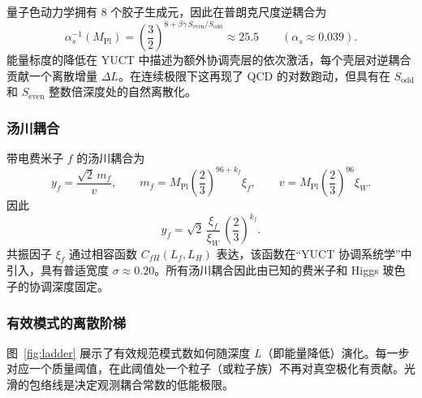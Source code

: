 \documentclass[12pt,a4paper]{article}
\begin{document}
	量子色动力学拥有 8 个胶子生成元，因此在普朗克尺度逆耦合为
	\begin{equation}
		\alpha_s^{-1}(M_{\mathrm{Pl}}) = \left(\frac{3}{2}\right)^{\!8 + \beta\gamma\,S_{\mathrm{even}}/S_{\mathrm{odd}}}
		\approx 25.5 \qquad (\alpha_s \approx 0.039) .
	\end{equation}
	能量标度的降低在 YUCT 中描述为额外协调壳层的依次激活，每个壳层对逆耦合贡献一个离散增量 \(\Delta L\)。在连续极限下这再现了 QCD 的对数跑动，但具有在 \(S_{\mathrm{odd}}\) 和 \(S_{\mathrm{even}}\) 整数倍深度处的自然离散化。
	
	\subsubsection{汤川耦合}
	
	带电费米子 \(f\) 的汤川耦合为
	\begin{equation}
		y_f = \frac{\sqrt{2}\,m_f}{v},
		\qquad
		m_f = M_{\mathrm{Pl}}\left(\frac{2}{3}\right)^{\!96+k_f}\xi_f,
		\qquad
		v   = M_{\mathrm{Pl}}\left(\frac{2}{3}\right)^{\!96}\xi_W .
	\end{equation}
	因此
	\begin{equation}
		y_f = \sqrt{2}\,\frac{\xi_f}{\xi_W}\,\left(\frac{2}{3}\right)^{\!k_f} .
	\end{equation}
	共振因子 \(\xi_f\) 通过相容函数 \(C_{fH}(L_f,L_H)\) 表达，该函数在“YUCT 协调系统学”中引入，具有普适宽度 \(\sigma \approx 0.20\)。所有汤川耦合因此由已知的费米子和 Higgs 玻色子的协调深度固定。
	
	\subsubsection{有效模式的离散阶梯}
	
	图~\ref{fig:ladder} 展示了有效规范模式数如何随深度 \(L\)（即能量降低）演化。每一步对应一个质量阈值，在此阈值处一个粒子（或粒子族）不再对真空极化有贡献。光滑的包络线是决定观测耦合常数的低能极限。
	
\end{document}
